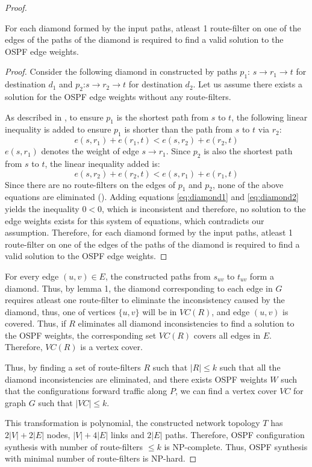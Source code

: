 \begin{proof}
\begin{lemma} \label{lemma:diamond}
	 For each diamond formed by the input paths, atleast 1 
	 route-filter on one of the edges of the paths of the diamond 
	 is required to find a valid solution to the
	 OSPF edge weights.  
\end{lemma}

\begin{proof}
Consider the following diamond in 
constructed by paths $p_1$: $s \rightarrow r_1 \rightarrow t$ 
for destination $d_1$ and $p_2$:$s \rightarrow r_2 \rightarrow t$ 
for destination $d_2$. Let us assume there exists a solution 
for the OSPF edge weights without any route-filters. 

As described in , 
to ensure $p_1$ is the shortest path from $s$ to $t$, the following
linear inequality is added to ensure $p_1$ is shorter than the
path from $s$ to $t$ via $r_2$: 
\begin{equation} \label{eq:diamond1}
	e(s,r_1) + e(r_1, t) < e(s, r_2) + e(r_2,t)
\end{equation}
$e(s,r_1)$ denotes the weight of edge $s \rightarrow r_1$.
Since $p_2$ is also the shortest path from $s$ 
to $t$, the linear inequality added is:
\begin{equation}  \label{eq:diamond2}
e(s,r_2) + e(r_2, t) < e(s, r_1) + e(r_1,t)
\end{equation}
Since there are no route-filters on the edges
of $p_1$ and $p_2$, none of the above equations are 
eliminated (). 
Adding equations \ref{eq:diamond1} and  \ref{eq:diamond2} 
yields the inequality $0 < 0$, which is inconsistent 
and therefore, no solution to 
the edge weights exists for this system of equations, 
which contradicts our assumption. Therefore,
for each diamond formed by the input paths, atleast 1 
route-filter on one of the edges of the paths of the diamond 
is required to find a valid solution to the
OSPF edge weights.  
\end{proof}

For every edge $(u,v) \in E$, the constructed paths from 
$s_{uv}$ to $t_{uv}$ form a diamond. Thus, by lemma 1, 
the diamond corresponding to each edge in $G$ 
requires atleast one route-filter to eliminate
the inconsistency caused by the diamond, thus, one 
of vertices $\{u,v\}$ will be in $VC(R)$, and edge $(u,v)$
is covered. Thus, if $R$ eliminates all diamond inconsistencies
to find a solution to the OSPF weights, the corresponding set
$VC(R)$ covers all edges in $E$. Therefore, $VC(R)$ is a vertex
cover. 

Thus, by finding a set of route-filters $R$ such that $|R| \leq k$
such that all the diamond inconsistencies are eliminated, and there
exists OSPF weights $W$ such that the configurations forward traffic
along $P$, we can find a vertex cover $VC$ for graph $G$ such that
$|VC| \leq k$. 

This transformation is polynomial, the constructed 
network topology $T$ has $2|V| + 2|E|$ nodes, 
$|V| + 4|E|$ links and $2|E|$ paths. Therefore, OSPF
configuration synthesis with number of route-filters $\leq k$ is
NP-complete. Thus, OSPF synthesis with minimal number of 
route-filters is NP-hard. 
\end{proof}